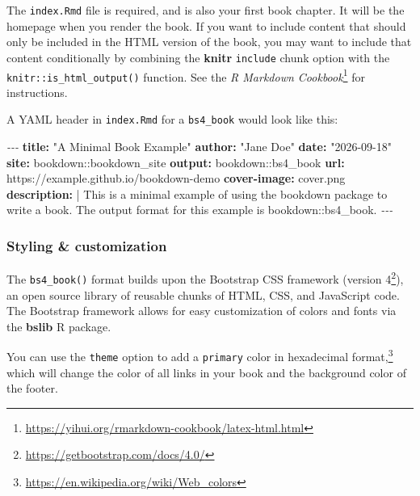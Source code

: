 \documentclass[
  12pt,
]{krantz}
\newenvironment{Shaded}{\begin{snugshade}}{\end{snugshade}}
\newcommand{\AttributeTok}[1]{\textcolor[rgb]{0.13,0.29,0.53}{#1}}
\newcommand{\CharTok}[1]{\textcolor[rgb]{0.31,0.60,0.02}{#1}}
\newcommand{\FunctionTok}[1]{\textcolor[rgb]{0.13,0.29,0.53}{\textbf{#1}}}
\newcommand{\KeywordTok}[1]{\textcolor[rgb]{0.13,0.29,0.53}{\textbf{#1}}}
\newcommand{\NormalTok}[1]{#1}
\newcommand{\PreprocessorTok}[1]{\textcolor[rgb]{0.56,0.35,0.01}{\textit{#1}}}
\newcommand{\StringTok}[1]{\textcolor[rgb]{0.31,0.60,0.02}{#1}}
\renewcommand{\href}[2]{#2\footnote{\url{#1}}}
\theoremstyle{definition}
\theoremstyle{definition}
\theoremstyle{definition}
\theoremstyle{definition}
\theoremstyle{remark}
\begin{document}
The \texttt{index.Rmd} file is required, and is also your first book chapter. It will be the homepage when you render the book. If you want to include content that should only be included in the HTML version of the book, you may want to include that content conditionally by combining the \textbf{knitr} \texttt{include} chunk option with the \texttt{knitr::is\_html\_output()} function. See the \href{https://yihui.org/rmarkdown-cookbook/latex-html.html}{\emph{R Markdown Cookbook}} for instructions.

A YAML header in \texttt{index.Rmd} for a \texttt{bs4\_book} would look like this:

\begin{Shaded}
\begin{Highlighting}[]
\PreprocessorTok{{-}{-}{-}}
\FunctionTok{title}\KeywordTok{:}\AttributeTok{ }\StringTok{"A Minimal Book Example"}
\FunctionTok{author}\KeywordTok{:}\AttributeTok{ }\StringTok{"Jane Doe"}
\FunctionTok{date}\KeywordTok{:}\AttributeTok{ }\StringTok{"2026{-}09{-}18"}
\FunctionTok{site}\KeywordTok{:}\AttributeTok{ bookdown::bookdown\_site}
\FunctionTok{output}\KeywordTok{:}\AttributeTok{ bookdown::bs4\_book}
\FunctionTok{url}\KeywordTok{:}\AttributeTok{ https://example.github.io/bookdown{-}demo}
\FunctionTok{cover{-}image}\KeywordTok{:}\AttributeTok{ cover.png}
\FunctionTok{description}\KeywordTok{: }\CharTok{|}
\NormalTok{  This is a minimal example of using the bookdown package to write a book.}
\NormalTok{  The output format for this example is bookdown::bs4\_book.}
\PreprocessorTok{{-}{-}{-}}
\end{Highlighting}
\end{Shaded}

\subsubsection{Styling \& customization}\label{styling-customization}

The \texttt{bs4\_book()} format builds upon the Bootstrap CSS framework (\href{https://getbootstrap.com/docs/4.0/}{version 4}), an open source library of reusable chunks of HTML, CSS, and JavaScript code. The Bootstrap framework allows for easy customization of colors and fonts via the \textbf{bslib} R package.

You can use the \texttt{theme} option to add a \texttt{primary} color in \href{https://en.wikipedia.org/wiki/Web_colors}{hexadecimal format,} which will change the color of all links in your book and the background color of the footer.
\end{document}
